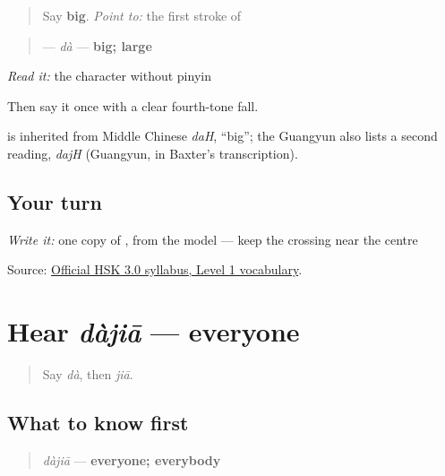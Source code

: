 \label{lesson:ZH-C13-da}



\begin{quote}
Say \textbf{big}. \emph{Point to:} the first stroke of 
\end{quote}

\begin{cousinweb}
\begin{quote}
\textbf{} — \emph{dà} — \textbf{big; large}
\end{quote}

\emph{Read it:} the character without pinyin

Then say it once with a clear fourth-tone fall.

\textbf{} is inherited from Middle Chinese \emph{daH}, \textquotedblleft{}big\textquotedblright{}; the Guangyun also lists a second reading, \emph{dajH} (Guangyun, in Baxter's transcription).
\end{cousinweb}

\subsection*{Your turn}
\emph{Write it:} one copy of \textbf{}, from the model — keep the crossing near the centre

\begin{tcolorbox}[breakable,colback=teal!4,colframe=teal!35!black,title={Before you move on}]
Source: \href{https://hsk.cn-bj.ufileos.com/3.0/\%E6\%96\%B0\%E7\%89\%88HSK\%E8\%80\%83\%E8\%AF\%95\%E5\%A4\%A7\%E7\%BA\%B21219.pdf}{Official HSK 3.0 syllabus, Level 1 vocabulary}.
\end{tcolorbox}
\section[dàjiā]{Hear \emph{dàjiā} — everyone}

\label{lesson:ZH-C13-hear-dajia}



\begin{quote}
Say \emph{dà}, then \emph{jiā}.
\end{quote}

\subsection*{What to know first}
\begin{quote}
\emph{dàjiā} — \textbf{everyone; everybody}
\end{quote}


